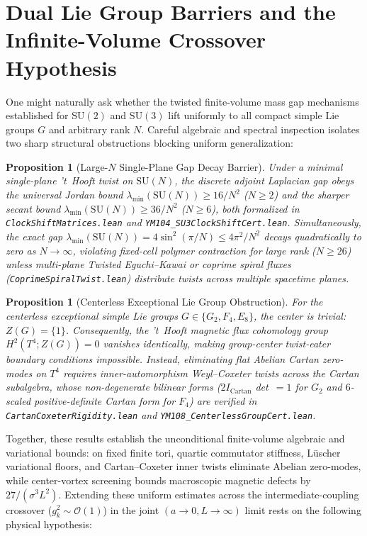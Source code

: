 \documentclass[11pt,a4paper]{article}
\newtheorem{proposition}[theorem]{Proposition}
\newcommand{\SU}{\mathrm{SU}}
\begin{document}
\section{Dual Lie Group Barriers and the Infinite-Volume Crossover Hypothesis}
One might naturally ask whether the twisted finite-volume mass gap mechanisms established for $\SU(2)$ and $\SU(3)$ lift uniformly to all compact simple Lie groups $G$ and arbitrary rank $N$. Careful algebraic and spectral inspection isolates two sharp structural obstructions blocking uniform generalization:

\begin{proposition}[Large-$N$ Single-Plane Gap Decay Barrier]
Under a minimal single-plane 't~Hooft twist on $\SU(N)$, the discrete adjoint Laplacian gap obeys the universal Jordan bound $\lambda_{\min}(\SU(N)) \ge 16/N^2$ ($N \ge 2$) and the sharper secant bound $\lambda_{\min}(\SU(N)) \ge 36/N^2$ ($N \ge 6$), both formalized in \texttt{ClockShiftMatrices.lean} and \texttt{YM104\_SU3ClockShiftCert.lean}. Simultaneously, the exact gap $\lambda_{\min}(\SU(N)) = 4 \sin^2(\pi/N) \le 4\pi^2 / N^2$ decays quadratically to zero as $N \to \infty$, violating fixed-cell polymer contraction for large rank ($N \ge 26$) unless multi-plane Twisted Eguchi--Kawai or coprime spiral fluxes (\texttt{CoprimeSpiralTwist.lean}) distribute twists across multiple spacetime planes.
\end{proposition}

\begin{proposition}[Centerless Exceptional Lie Group Obstruction]
For the centerless exceptional simple Lie groups $G \in \{G_2, F_4, E_8\}$, the center is trivial: $Z(G) = \{1\}$. Consequently, the 't~Hooft magnetic flux cohomology group $H^2(T^4; Z(G)) = 0$ vanishes identically, making group-center twist-eater boundary conditions impossible. Instead, eliminating flat Abelian Cartan zero-modes on $T^4$ requires inner-automorphism Weyl--Coxeter twists across the Cartan subalgebra, whose non-degenerate bilinear forms ($2 I_{\mathrm{Cartan}}$ det~$= 1$ for $G_2$ and $6$-scaled positive-definite Cartan form for $F_4$) are verified in \texttt{CartanCoxeterRigidity.lean} and \texttt{YM108\_CenterlessGroupCert.lean}.
\end{proposition}

Together, these results establish the unconditional finite-volume algebraic and variational bounds: on fixed finite tori, quartic commutator stiffness, L\"uscher variational floors, and Cartan--Coxeter inner twists eliminate Abelian zero-modes, while center-vortex screening bounds macroscopic magnetic defects by $27 / (\sigma^3 L^2)$. Extending these uniform estimates across the intermediate-coupling crossover ($g_k^2 \sim \mathcal{O}(1)$) in the joint $(a \to 0, L \to \infty)$ limit rests on the following physical hypothesis:
\end{document}
